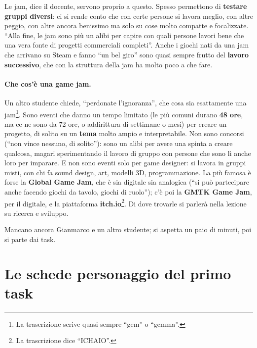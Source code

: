 Le jam, dice il docente, servono proprio a questo. Spesso permettono di
\textbf{testare gruppi diversi}: ci si rende conto che con certe persone si lavora
meglio, con altre peggio, con altre ancora benissimo ma solo su cose molto
compatte e focalizzate. ``Alla fine, le jam sono più un alibi per capire con quali
persone lavori bene che una vera fonte di progetti commerciali completi''. Anche
i giochi nati da una jam che arrivano su Steam e fanno ``un bel giro'' sono
quasi sempre frutto del \textbf{lavoro successivo}, che con la struttura della jam
ha molto poco a che fare.

\paragraph{Che cos'è una game jam.} Un altro studente chiede, ``perdonate
l'ignoranza'', che cosa sia esattamente una jam\footnote{La trascrizione scrive
quasi sempre ``gem'' o ``gemma''.}. Sono eventi che danno un tempo limitato (le più
comuni durano \textbf{48 ore}, ma ce ne sono da 72 ore, o addirittura di settimane
o mesi) per creare un progetto, di solito su un \textbf{tema} molto ampio e
interpretabile. Non sono concorsi (``non vince nessuno, di solito''): sono un
alibi per avere una spinta a creare qualcosa, magari sperimentando il lavoro di
gruppo con persone che sono lì anche loro per imparare. E non sono eventi solo per
game designer: si lavora in gruppi misti, con chi fa sound design, art, modelli
3D, programmazione. La più famosa è forse la \textbf{Global Game Jam}, che è sia
digitale sia analogica (``si può partecipare anche facendo giochi da tavolo, giochi
di ruolo''); c'è poi la \textbf{GMTK Game Jam}, per il digitale, e la piattaforma
\textbf{itch.io}\footnote{La trascrizione dice ``ICHAIO''.}. Di dove trovarle si
parlerà nella lezione su ricerca e sviluppo.

Mancano ancora Gianmarco e un altro studente; si aspetta un paio di minuti, poi si
parte dai task.

\section{Le schede personaggio del primo task}
\label{a5:sec:schede}



